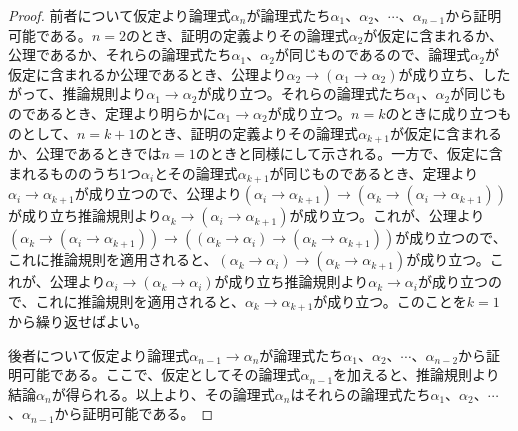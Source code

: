 \documentclass[a4paper]{jsarticle}
\begin{document}
\begin{proof}
前者について仮定より論理式$\alpha_{n}$が論理式たち$\alpha_{1}$、$\alpha_{2}$、$\cdots$、$\alpha_{n - 1}$から証明可能である。$n = 2$のとき、証明の定義よりその論理式$\alpha_{2}$が仮定に含まれるか、公理であるか、それらの論理式たち$\alpha_{1}$、$\alpha_{2}$が同じものであるので、論理式$\alpha_{2}$が仮定に含まれるか公理であるとき、公理より$\alpha_{2} \rightarrow \left( \alpha_{1} \rightarrow \alpha_{2} \right)$が成り立ち、したがって、推論規則より$\alpha_{1} \rightarrow \alpha_{2}$が成り立つ。それらの論理式たち$\alpha_{1}$、$\alpha_{2}$が同じものであるとき、定理より明らかに$\alpha_{1} \rightarrow \alpha_{2}$が成り立つ。$n = k$のときに成り立つものとして、$n = k + 1$のとき、証明の定義よりその論理式$\alpha_{k + 1}$が仮定に含まれるか、公理であるときでは$n = 1$のときと同様にして示される。一方で、仮定に含まれるもののうち1つ$\alpha_{i}$とその論理式$\alpha_{k + 1}$が同じものであるとき、定理より$\alpha_{i} \rightarrow \alpha_{k + 1}$が成り立つので、公理より$\left( \alpha_{i} \rightarrow \alpha_{k + 1} \right) \rightarrow \left( \alpha_{k} \rightarrow \left( \alpha_{i} \rightarrow \alpha_{k + 1} \right) \right)$が成り立ち推論規則より$\alpha_{k} \rightarrow \left( \alpha_{i} \rightarrow \alpha_{k + 1} \right)$が成り立つ。これが、公理より$\left( \alpha_{k} \rightarrow \left( \alpha_{i} \rightarrow \alpha_{k + 1} \right) \right) \rightarrow \left( \left( \alpha_{k} \rightarrow \alpha_{i} \right) \rightarrow \left( \alpha_{k} \rightarrow \alpha_{k + 1} \right) \right)$が成り立つので、これに推論規則を適用されると、$\left( \alpha_{k} \rightarrow \alpha_{i} \right) \rightarrow \left( \alpha_{k} \rightarrow \alpha_{k + 1} \right)$が成り立つ。これが、公理より$\alpha_{i} \rightarrow \left( \alpha_{k} \rightarrow \alpha_{i} \right)$が成り立ち推論規則より$\alpha_{k} \rightarrow \alpha_{i}$が成り立つので、これに推論規則を適用されると、$\alpha_{k} \rightarrow \alpha_{k + 1}$が成り立つ。このことを$k = 1$から繰り返せばよい。\par
後者について仮定より論理式$\alpha_{n - 1} \rightarrow \alpha_{n}$が論理式たち$\alpha_{1}$、$\alpha_{2}$、$\cdots$、$\alpha_{n - 2}$から証明可能である。ここで、仮定としてその論理式$\alpha_{n - 1}$を加えると、推論規則より結論$\alpha_{n}$が得られる。以上より、その論理式$\alpha_{n}$はそれらの論理式たち$\alpha_{1}$、$\alpha_{2}$、$\cdots$、$\alpha_{n - 1}$から証明可能である。
\end{proof}
\end{document}
